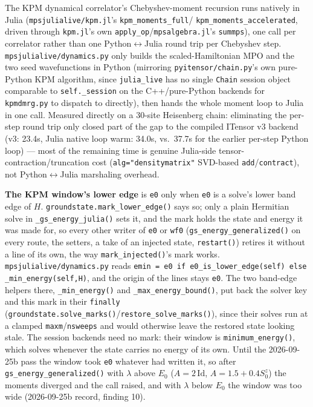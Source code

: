 \documentclass[11pt]{article}
\begin{document}
The KPM dynamical correlator's Chebyshev-moment recursion runs natively
in Julia (\texttt{mpsjulialive/kpm.jl}'s \texttt{kpm\_moments\_full}/
\texttt{kpm\_moments\_accelerated}, driven through \texttt{kpm.jl}'s own
\texttt{apply\_op}/\texttt{mpsalgebra.jl}'s \texttt{summps}), one call
per correlator rather than one Python$\leftrightarrow$Julia round trip
per Chebyshev step. \texttt{mpsjulialive/dynamics.py} only builds the
scaled-Hamiltonian MPO and the two seed wavefunctions in Python
(mirroring \texttt{pyitensor/chain.py}'s own pure-Python KPM algorithm,
since \texttt{julia\_live} has no single \texttt{Chain} session object
comparable to \texttt{self.\_session} on the C++/pure-Python backends for
\texttt{kpmdmrg.py} to dispatch to directly), then hands the whole moment
loop to Julia in one call. Measured directly on a 30-site Heisenberg
chain: eliminating the per-step round trip only closed part of the gap
to the compiled ITensor v3 backend (v3: 23.4s, Julia native loop warm:
34.0s, vs.\ 37.7s for the earlier per-step Python loop) --- most of the
remaining time is genuine Julia-side tensor-contraction/truncation cost
(\texttt{alg="densitymatrix"} SVD-based \texttt{add}/\texttt{contract}),
not Python$\leftrightarrow$Julia marshaling overhead.

\textbf{The KPM window's lower edge} is \texttt{e0} only when \texttt{e0}
is a solve's lower band edge of $H$. \texttt{groundstate.mark\_lower\_edge()}
says so; only a plain Hermitian solve in \texttt{\_gs\_energy\_julia()}
sets it, and the mark holds the state and energy it was made for, so every
other writer of \texttt{e0} or \texttt{wf0}
(\texttt{gs\_energy\_generalized()} on every route, the setters, a take of
an injected state, \texttt{restart()}) retires it without a line of its
own, the way \texttt{mark\_injected()}'s mark works.
\texttt{mpsjulialive/dynamics.py} reads
\texttt{emin = e0 if e0\_is\_lower\_edge(self) else \_min\_energy(self,H)},
and the origin of the lines stays \texttt{e0}. The two band-edge helpers
there, \texttt{\_min\_energy()} and \texttt{\_max\_energy\_bound()}, put
back the solver key and this mark in their \texttt{finally}
(\texttt{groundstate.solve\_marks()}/\texttt{restore\_solve\_marks()}),
since their solves run at a clamped \texttt{maxm}/\texttt{nsweeps} and
would otherwise leave the restored state looking stale. The session
backends need no mark: their window is \texttt{minimum\_energy()}, which
solves whenever the state carries no energy of its own. Until the
2026-09-25b pass the window took \texttt{e0} whatever had written it, so
after \texttt{gs\_energy\_generalized()} with $\lambda$ above $E_0$
($A=2\,\mathrm{Id}$, $A=1.5+0.4S^z_0$) the moments diverged and the call
raised, and with $\lambda$ below $E_0$ the window was too wide
(2026-09-25b record, finding 10).
\end{document}

